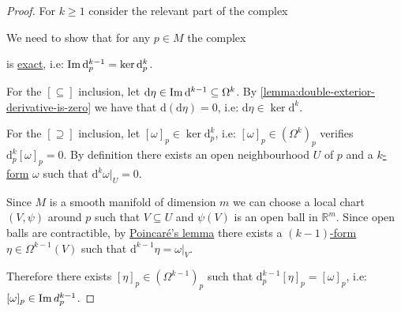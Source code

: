 \documentclass[../../main]{subfiles}
\begin{document}
\begin{proof}
  For \(k \geq 1\) consider the relevant part of the complex
  \begin{center}
  \end{center}
  We need to show that for any \(p \in M\) the complex
  \begin{center}
  \end{center}
  is \hyperref[def:exact-sequence]{exact}, i.e: \(\operatorname*{Im} \mathrm{d}_{p}^{k-1} = \ker \mathrm{d}_{p}^{k}\).

  For the \([\subseteq]\) inclusion, let \(\mathrm{d}\eta \in \operatorname*{Im} \mathrm{d}^{k-1} \subseteq \Omega^{k}\). By \autoref{lemma:double-exterior-derivative-is-zero} we have that \(\mathrm{d}(\mathrm{d}\eta) = 0\), i.e: \(\mathrm{d}\eta \in \ker \mathrm{d}^{k}\).

  For the \([\supseteq]\) inclusion, let \([\omega]_{p} \in \ker \mathrm{d}_{p}^{k}\), i.e: \([\omega]_{p} \in \left( \Omega^{k} \right)_{p}\) verifies \(\mathrm{d}_{p}^{k}[\omega]_{p} = 0\).
  By definition there exists an open neighbourhood \(U\) of \(p\) and a \hyperref[def:smooth-k-form]{\(k\)-form} \(\omega\) such that \(\mathrm{d}^{k}\omega|_{U} = 0\).

  Since \(M\) is a smooth manifold of dimension \(m\) we can choose a local chart \((V, \psi)\) around \(p\) such that \(V \subseteq U\) and \(\psi(V)\) is an open ball in \(\mathbb{R}^{m}\).
  Since open balls are contractible, by \hyperref[lemma:poincare]{Poincaré's lemma} there exists a \hyperref[def:smooth-k-form]{\((k-1)\)-form} \(\eta \in \Omega^{k-1}(V)\) such that \(\mathrm{d}^{k-1}\eta = \omega|_{V}\).

  Therefore there exists \([\eta]_{p} \in \left( \Omega^{k-1} \right)_{p}\) such that \(\mathrm{d}_{p}^{k-1}[\eta]_{p} = [\omega]_{p}\), i.e: \([\omega]_{p} \in \operatorname*{Im} d_{p}^{k-1}\).
\end{proof}
\end{document}
